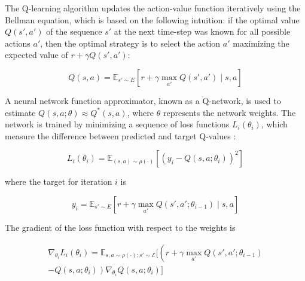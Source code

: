 \documentclass[twocolumn]{webofc}
\begin{document}
The Q-learning algorithm updates the action-value function iteratively using the Bellman equation, which is based on the following intuition: if the optimal value $Q(s', a')$ of the sequence $s'$ at the next time-step was known for all possible actions $a'$, then the optimal strategy is to select the action $a'$ maximizing the expected value of $r + \gamma Q(s', a')$: \cite{mnih2013playingatarideepreinforcement}

\begin{equation}
    Q(s, a) = \mathbb{E}_{s' \sim E} \left[ r + \gamma \max_{a'} Q(s', a') \mid s, a \right]
\end{equation}

A neural network function approximator, known as a Q-network, is used to estimate $Q(s, a; \theta) \approx Q^*(s, a)$, where $\theta$ represents the network weights. The network is trained by minimizing a sequence of loss functions $L_i(\theta_i)$, which measure the difference between predicted and target Q-values \cite{mnih2013playingatarideepreinforcement}:

\begin{equation}
    L_i(\theta_i) = \mathbb{E}_{(s,a) \sim \rho(\cdot)} \left[ \left( y_i - Q(s, a; \theta_i) \right)^2 \right]
\end{equation}

where the target for iteration $i$ is

\begin{equation}
    y_i = \mathbb{E}_{s' \sim E} \left[ r + \gamma \max_{a'} Q(s', a'; \theta_{i-1}) \mid s, a \right]
\end{equation}

The gradient of the loss function with respect to the weights is

\begin{equation}
\begin{aligned}
\nabla_{\theta_i} L_i(\theta_i) = \mathbb{E}_{s, a \sim \rho(\cdot); s' \sim \mathcal{E}} \Bigg[ \left( r + \gamma \max_{a'} Q(s', a'; \theta_{i-1}) \right. \\
\left. - Q(s, a; \theta_i) \right) \nabla_{\theta_i} Q(s, a; \theta_i) \Bigg]
\end{aligned}
\end{equation}

\end{document}
